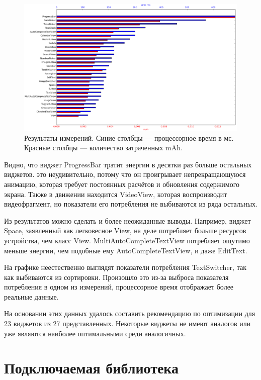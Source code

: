 \documentclass[a4paper,14pt]{extarticle} %
\begin{document}
	\begin{figure}[!htb]
		\includegraphics[width=\textwidth]{result_scaled}
		\caption{Результаты измерений. Синие столбцы --- процессорное время в мс. Красные столбцы --- количество затраченных mAh.}
		\label{fig:result_scaled}
	\end{figure}

	Видно, что виджет ProgressBar тратит энергии в десятки раз больше остальных виджетов. это неудивительно, потому что он проигрывает непрекращающуюся анимацию, которая требует постоянных расчётов и обновления содержимого экрана. Также в движении находится VideoView, которая воспроизводит видеофрагмент, но показатели его потребления не выбиваются из ряда остальных.
	
	Из результатов можно сделать и более неожиданные выводы. Например, виджет Space, заявленный как легковесное View, на деле потребляет больше ресурсов устройства, чем класс View. MultiAutoCompleteTextView потребляет ощутимо меньше энергии, чем подобные ему AutoCompleteTextView, и даже EditText.

	
	На графике неестественно выглядят показатели потребления TextSwitcher, так как выбиваются из сортировки. Произошло это из-за выброса показателя потребления в одном из измерений, процессорное время отображает более реальные данные.
	
	На основании этих данных удалось составить рекомендацию по оптимизации для 23 виджетов из 27 представленных. Некоторые виджеты не имеют аналогов или уже являются наиболее оптимальными среди аналогичных.
	
	\newpage
	\section{Подключаемая библиотека}
	
\end{document}
